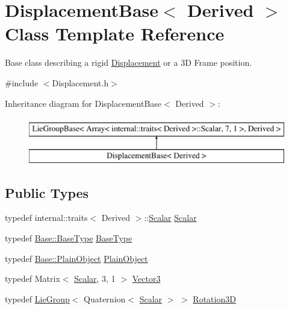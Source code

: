 \hypertarget{class_displacement_base}{}\section{Displacement\+Base$<$ Derived $>$ Class Template Reference}
\label{class_displacement_base}


Base class describing a rigid \hyperlink{class_displacement}{Displacement} or a 3D Frame position.  




{\ttfamily \#include $<$Displacement.\+h$>$}

Inheritance diagram for Displacement\+Base$<$ Derived $>$\+:\begin{figure}[H]
\begin{center}
\leavevmode
\includegraphics[height=2.000000cm]{class_displacement_base}
\end{center}
\end{figure}
\subsection*{Public Types}
\begin{DoxyCompactItemize}
\item 
typedef internal\+::traits$<$ Derived $>$\+::\hyperlink{class_displacement_base_a978caf313131fd9d221a856a2e4a80ad}{Scalar} \hyperlink{class_displacement_base_a978caf313131fd9d221a856a2e4a80ad}{Scalar}
\item 
typedef \hyperlink{class_lie_group_base_a895bed679f100c71c6dcbfd5532635b0}{Base\+::\+Base\+Type} \hyperlink{class_displacement_base_ac2d1983c0f84aa8d974283e3a48a2434}{Base\+Type}
\item 
typedef \hyperlink{class_lie_group_base_a37b1d64048a2fa65b298801f6028c468}{Base\+::\+Plain\+Object} \hyperlink{class_displacement_base_aaa66ea6d4bdfcd9ca5fbfafbc66e78b9}{Plain\+Object}
\item 
typedef Matrix$<$ \hyperlink{class_displacement_base_a978caf313131fd9d221a856a2e4a80ad}{Scalar}, 3, 1 $>$ \hyperlink{class_displacement_base_a0b5e3b97de6478fd98bf6aec9730d4c4}{Vector3}
\item 
typedef \hyperlink{class_lie_group}{Lie\+Group}$<$ Quaternion$<$ \hyperlink{class_displacement_base_a978caf313131fd9d221a856a2e4a80ad}{Scalar} $>$ $>$ \hyperlink{class_displacement_base_aca59ea9e7f5fb3b67a489726bced7f4f}{Rotation3D}
\end{DoxyCompactItemize}

